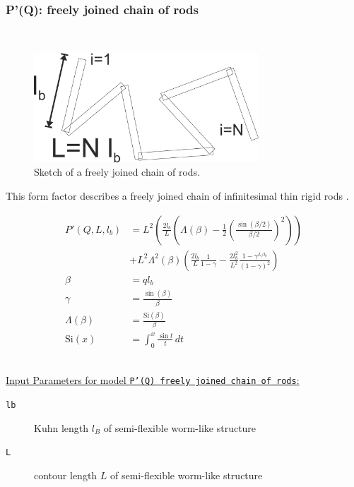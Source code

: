 \clearpage
\subsubsection{P'(Q): freely joined chain of rods} ~\\
\label{plugin:Pprime4freelyjoinedchainofrods}

\begin{figure}[htb]
\begin{center}
\includegraphics[width=0.75\textwidth]{freelyjoinedchainofrod.png}
\end{center}
\caption{Sketch of a freely joined chain of rods.}
\label{fig:freelyjoined chainofrod}
\end{figure}

This form factor describes a freely joined chain of infinitesimal thin rigid rods \cite{Hermans1958}.

\begin{align}
P'(Q,L,l_b) &= L^2\left( \frac{2l_b}{L}\left(\Lambda(\beta)-\frac12\left(\frac{\sin(\beta/2)}{\beta/2}\right)^2\right)\right)
\label{eq:PprimeFreelyJoinedRods}\\
&+L^2\Lambda^2(\beta)\left(\frac{2l_b}{L}\frac{1}{1-\gamma}-\frac{2l_b^2}{L^2}\frac{1-\gamma^{L/l_b}}{\left(1-\gamma\right)^2}\right) \nonumber \\
\beta &= q l_b \\
\gamma &= \frac{\sin(\beta)}{\beta} \\
\Lambda(\beta) &= \frac{\mathrm{Si}(\beta)}{\beta} \\
\mathrm{Si}(x) &= \int _{0}^{x}{\frac {\sin t}{t}}\,dt
\end{align}

\vspace{5mm}

\hspace{1pt}\\
\underline{Input Parameters for model \texttt{P'(Q) freely joined chain of rods}:}\\
\begin{description}
\item[\texttt{lb}] Kuhn length $l_B$ of semi-flexible worm-like structure
\item[\texttt{L}] contour length $L$ of semi-flexible worm-like structure
\end{description}

